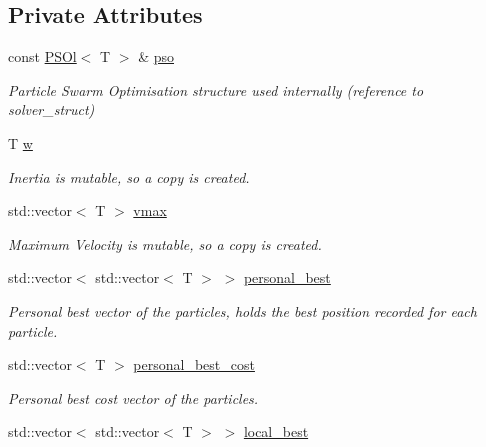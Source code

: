 \subsection*{Private Attributes}
\begin{DoxyCompactItemize}
\item 
const \hyperlink{structea_1_1_p_s_ol}{P\+S\+Ol}$<$ T $>$ \& \hyperlink{classea_1_1_solver_3_01_p_s_ol_00_01_t_00_01_f_00_01_c_01_4_a3098f083ef04a0ce7ae0eef22dd80442}{pso}
\begin{DoxyCompactList}\small\item\em Particle Swarm Optimisation structure used internally (reference to solver\+\_\+struct) \end{DoxyCompactList}\item 
T \hyperlink{classea_1_1_solver_3_01_p_s_ol_00_01_t_00_01_f_00_01_c_01_4_a5c9d1a207892da92e2cf689b24c256ee}{w}
\begin{DoxyCompactList}\small\item\em Inertia is mutable, so a copy is created. \end{DoxyCompactList}\item 
std\+::vector$<$ T $>$ \hyperlink{classea_1_1_solver_3_01_p_s_ol_00_01_t_00_01_f_00_01_c_01_4_abd93da2229dac4eb2d11f4904a65ae9a}{vmax}
\begin{DoxyCompactList}\small\item\em Maximum Velocity is mutable, so a copy is created. \end{DoxyCompactList}\item 
std\+::vector$<$ std\+::vector$<$ T $>$ $>$ \hyperlink{classea_1_1_solver_3_01_p_s_ol_00_01_t_00_01_f_00_01_c_01_4_a0738e0ab079273c4d34c827fad533868}{personal\+\_\+best}
\begin{DoxyCompactList}\small\item\em Personal best vector of the particles, holds the best position recorded for each particle. \end{DoxyCompactList}\item 
std\+::vector$<$ T $>$ \hyperlink{classea_1_1_solver_3_01_p_s_ol_00_01_t_00_01_f_00_01_c_01_4_ae728d584641709062919b0cedd3e77cc}{personal\+\_\+best\+\_\+cost}
\begin{DoxyCompactList}\small\item\em Personal best cost vector of the particles. \end{DoxyCompactList}\item 
std\+::vector$<$ std\+::vector$<$ T $>$ $>$ \hyperlink{classea_1_1_solver_3_01_p_s_ol_00_01_t_00_01_f_00_01_c_01_4_a6671c3d551564e3b4cd0944bfb2c33fd}{local\+\_\+best}

\end{DoxyCompactItemize}

